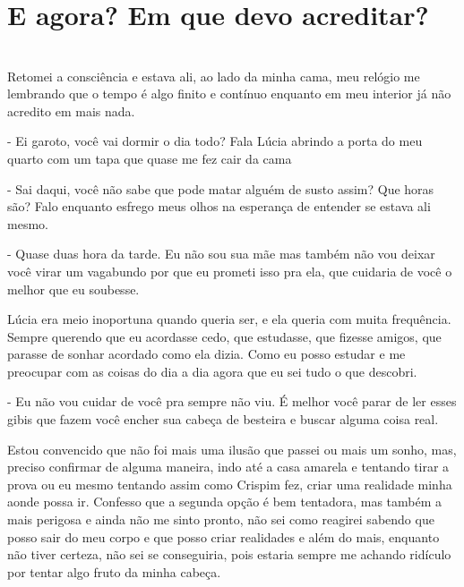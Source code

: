 \newpage
\ifdefined\useChapters
\chapter{E agora? Em que devo acreditar?}
\else
\chapter{}
\fi


Retomei a consciência e estava ali, ao lado da minha cama, meu relógio me lembrando que o tempo é algo finito e contínuo enquanto em meu interior já não acredito em mais nada.

- Ei garoto, você vai dormir o dia todo? Fala Lúcia abrindo a porta do meu quarto com um tapa que quase me fez cair da cama

- Sai daqui, você não sabe que pode matar alguém de susto assim? Que horas são? Falo enquanto esfrego meus olhos na esperança de entender se estava ali mesmo.

- Quase duas hora da tarde. Eu não sou sua mãe mas também não vou deixar você virar um vagabundo por que eu prometi isso pra ela, que cuidaria de você o melhor que eu soubesse.

Lúcia era meio inoportuna quando queria ser, e ela queria com muita frequência. Sempre querendo que eu acordasse cedo, que estudasse, que fizesse amigos, que parasse de sonhar acordado como ela dizia. Como eu posso estudar e me preocupar com as coisas do dia a dia agora que eu sei tudo o que descobri.

- Eu não vou cuidar de você pra sempre não viu. É melhor você parar de ler esses gibis que fazem você encher sua cabeça de besteira e buscar alguma coisa real.

Estou convencido que não foi mais uma ilusão que passei ou mais um sonho, mas, preciso confirmar de alguma maneira, indo até a casa amarela e tentando tirar a prova ou eu mesmo tentando assim como Crispim fez, criar uma realidade minha aonde possa ir. Confesso que a segunda opção é bem tentadora, mas também a mais perigosa e ainda não me sinto pronto, não sei como reagirei sabendo que posso sair do meu corpo e que posso criar realidades e além do mais, enquanto não tiver certeza, não sei se conseguiria, pois estaria sempre me achando ridículo por tentar algo fruto da minha cabeça.

